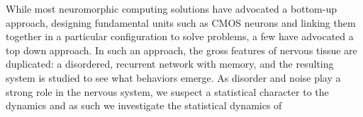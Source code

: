 \documentclass[aps,prl,preprint,groupedaddress]{revtex4-1}
\begin{document}
While most neuromorphic computing solutions have advocated a bottom-up
approach, designing fundamental units such as CMOS neurons
and linking them together in a
particular configuration to solve problems, a few have advocated a top
down approach.  In such an approach, the gross features of nervous
tissue are duplicated: a disordered, recurrent network with memory, and
the resulting system is studied to see what behaviors emerge.  As disorder
and noise play a strong role in the nervous system, we suspect a statistical
character to the dynamics and as such we investigate the statistical
dynamics of 




%


\end{document}
